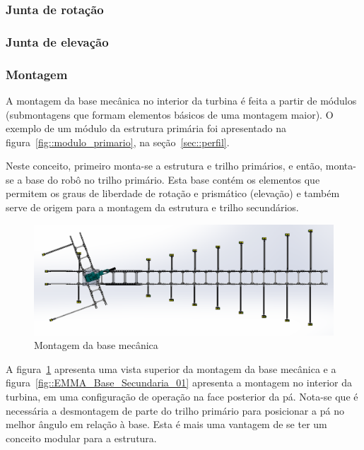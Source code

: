 \subsubsection{Junta de rotação}

\subsubsection{Junta de elevação}

\subsubsection{Montagem}

A montagem da base mecânica no interior da turbina é feita a partir de módulos
(submontagens que formam elementos básicos de uma montagem maior). O exemplo de
um módulo da estrutura primária foi apresentado na
figura~\ref{fig::modulo_primario}, na seção~\ref{sec::perfil}. 

Neste conceito, primeiro monta-se a estrutura e trilho
primários, e então, monta-se a base do robô no trilho primário. Esta base contém
os elementos que permitem os graus de liberdade de rotação e prismático
(elevação) e também serve de origem para a montagem da estrutura e trilho
secundários. 

\begin{figure}[H]
	\centering
	\includegraphics[width=0.9\columnwidth]{figs/construcao/EMMA_Base_Secundaria_04}
	\caption{Montagem da base mecânica}
    \label{fig::EMMA_Base_Secundaria_04}
\end{figure}

A figura~\ref{fig::EMMA_Base_Secundaria_04} apresenta uma vista superior da
montagem da base mecânica e a figura~\ref{fig::EMMA_Base_Secundaria_01}
apresenta a montagem no interior da turbina, em uma configuração de operação na
face posterior da pá. Nota-se que é necessária a desmontagem de parte do trilho
primário para posicionar a pá no melhor ângulo em relação à base. Esta é mais
uma vantagem de se ter um conceito modular para a estrutura.

